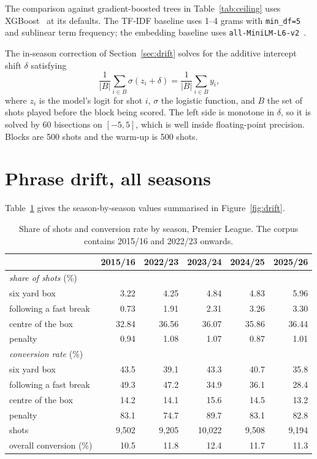\documentclass[conference]{IEEEtran}
\newcommand{\num}[1]{\mbox{#1}}
\begin{document}
The comparison against gradient-boosted trees in Table~\ref{tab:ceiling} uses
XGBoost~\cite{chen2016xgboost} at its defaults. The TF-IDF baseline uses
1--4 grams with \texttt{min\_df=5} and sublinear term frequency; the embedding
baseline uses \texttt{all-MiniLM-L6-v2}~\cite{reimers2019sbert}.

The in-season correction of Section~\ref{sec:drift} solves for the additive
intercept shift $\delta$ satisfying
\begin{equation}
\frac{1}{|B|}\sum_{i \in B}
  \sigma\!\left(z_i + \delta\right) = \frac{1}{|B|}\sum_{i \in B} y_i ,
\end{equation}
where $z_i$ is the model's logit for shot $i$, $\sigma$ the logistic function,
and $B$ the set of shots played before the block being scored. The left side is
monotone in $\delta$, so it is solved by 60 bisections on $[-5, 5]$, which is
well inside floating-point precision. Blocks are 500 shots and the warm-up is
500 shots.

\section{Phrase drift, all seasons}
\label{app:drift}

Table~\ref{tab:appdrift} gives the season-by-season values summarised in
Figure~\ref{fig:drift}.

\begin{table}[t]
\caption{Share of shots and conversion rate by season, Premier League. The
corpus contains 2015/16 and 2022/23 onwards.}
\label{tab:appdrift}
\centering
\footnotesize
\begin{tabular}{lrrrrr}
\toprule
& 2015/16 & 2022/23 & 2023/24 & 2024/25 & 2025/26 \\
\midrule
\multicolumn{6}{l}{\emph{share of shots} (\%)} \\
six yard box & 3.22 & 4.25 & 4.84 & 4.83 & 5.96 \\
following a fast break & 0.73 & 1.91 & 2.31 & 3.26 & 3.30 \\
centre of the box  & 32.84 & 36.56 & 36.07 & 35.86 & 36.44 \\
penalty            & 0.94 & 1.08 & 1.07 & 0.87 & 1.01 \\
\midrule
\multicolumn{6}{l}{\emph{conversion rate} (\%)} \\
six yard box & 43.5 & 39.1 & 43.3 & 40.7 & 35.8 \\
following a fast break & 49.3 & 47.2 & 34.9 & 36.1 & 28.4 \\
centre of the box  & 14.2 & 14.1 & 15.6 & 14.5 & 13.2 \\
penalty            & 83.1 & 74.7 & 89.7 & 83.1 & 82.8 \\
\midrule
shots              & \num{9,502} & \num{9,205} & \num{10,022} & \num{9,508} & \num{9,194} \\
overall conversion (\%) & 10.5 & 11.8 & 12.4 & 11.7 & 11.3 \\
\bottomrule
\end{tabular}
\end{table}
\end{document}
